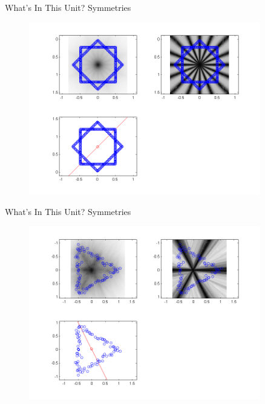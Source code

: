 \documentclass{beamer}
\begin{document}
\begin{frame}{What's In This Unit?}
Symmetries

\begin{figure}[t]
    \centering
	\includegraphics[width=0.9\textwidth]{starsym.png}
\end{figure}

\end{frame}

\begin{frame}{What's In This Unit?}
Symmetries

\begin{figure}[t]
    \centering
	\includegraphics[width=0.9\textwidth]{trianglesym1.png}
\end{figure}

\end{frame}
\end{document}

